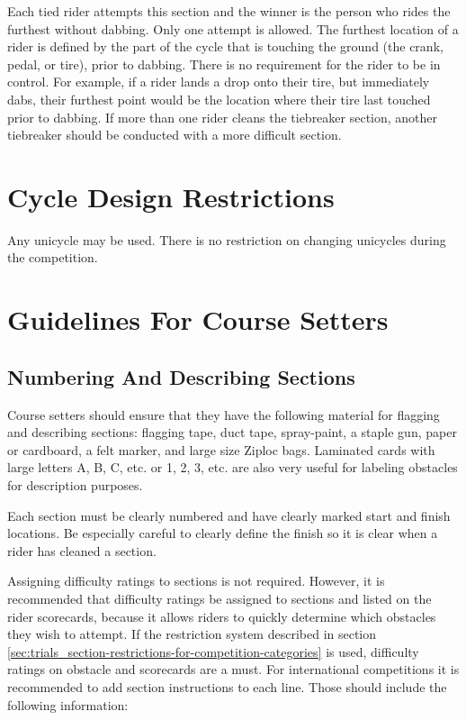 Each tied rider attempts this section and the winner is the person who rides the furthest without dabbing.
Only one attempt is allowed. 
The furthest location of a rider is defined by the part of the cycle that is touching the ground (the crank, pedal, or tire), prior to dabbing. 
There is no requirement for the rider to be in control. 
For example, if a rider lands a drop onto their tire, but immediately dabs, their furthest point would be the location where their tire last touched prior to dabbing.
If more than one rider cleans the tiebreaker section, another tiebreaker should be conducted with a more difficult section.

\section{Cycle Design Restrictions}
Any unicycle may be used. 
There is no restriction on changing unicycles during the competition.

\section{Guidelines For Course Setters \label{sec:trials_guidelines-for-course-setters}}

\subsection{Numbering And Describing Sections}
Course setters should ensure that they have the following material for flagging and describing sections: flagging tape, duct tape, spray-paint, a staple gun, paper or cardboard, a felt marker, and large size Ziploc bags. 
Laminated cards with large letters A, B, C, etc. or 1, 2, 3, etc. are also very useful for labeling obstacles for description purposes.

Each section must be clearly numbered and have clearly marked start and finish locations. 
Be especially careful to clearly define the finish so it is clear when a rider has cleaned a section.

Assigning difficulty ratings to sections is not required. 
However, it is recommended that difficulty ratings be assigned to sections and listed on the rider scorecards, because it allows riders to quickly determine which obstacles they wish to attempt. 
If the restriction system described in section \ref{sec:trials_section-restrictions-for-competition-categories} is used, difficulty ratings on obstacle and scorecards are a must. 
For international competitions it is recommended to add section instructions to each line. 
Those should include the following information:


